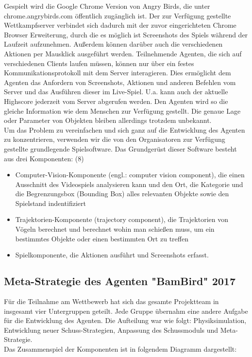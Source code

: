 Gespielt wird die Google Chrome Version von Angry Birds, die unter chrome.angrybirds.com öffentlich zugänglich ist. Der zur Verfügung gestellte Wettkampfserver verbindet sich dadurch mit der zuvor eingerichteten Chrome Browser Erweiterung, durch die es möglich ist Screenshots des Spiels während der Laufzeit aufzunehmen. Außerdem können darüber auch die verschiedenen Aktionen per Mausklick ausgeführt werden. Teilnehmende Agenten, die sich auf verschiedenen Clients laufen müssen, können nur über ein festes Kommunikationsprotokoll mit dem Server interagieren. Dies ermöglicht dem Agenten das Anfordern von Screenshots, Aktionen und anderen Befehlen vom Server und das Ausführen dieser im Live-Spiel. U.a. kann auch der aktuelle Highscore jederzeit vom Server abgerufen werden. Den Agenten wird so die gleiche Information wie dem Menschen zur Verfügung gestellt. Die genaue Lage oder Parameter von Objekten bleiben allerdings trotzdem unbekannt.\\
Um das Problem zu vereinfachen und sich ganz auf die Entwicklung des Agenten zu konzentrieren, verwenden wir die von den Organisatoren zur Verfügung gestellte grundlegende Spielsoftware. Das Grundgerüst dieser Software besteht aus drei Komponenten: (8)

\begin{itemize}
\item Computer-Vision-Komponente (engl.: computer vision component), die einen Ausschnitt des Videospiels analysieren kann und den Ort, die Kategorie und die Begrenzungsbox (Bounding Box) alles relevanten Objekte sowie den Spielstand indentifiziert
\item Trajektorien-Komponente (trajectory component), die Trajektorien von Vögeln berechnet und berechnet wohin man schießen muss, um ein bestimmtes Objekte oder einen bestimmten Ort zu treffen
\item Spielkomponente, die Aktionen ausführt und Screenshots erfasst.
\end{itemize}

\subsection{Meta-Strategie des Agenten "BamBird" 2017}
Für die Teilnahme am Wettbewerb hat sich das gesamte Projektteam in insgesamt vier Untergruppen geteilt. Jede Gruppe übernahm eine andere Aufgabe für die Entwicklung des Agenten. Die Aufteilung war wie folgt: Physiksimulation, Entwicklung neuer Schuss-Strategien, Anpassung des Schussmoduls und Meta-Strategie.\\
Das Zusammenspiel der Komponenten ist in folgendem Diagramm dargestellt:

